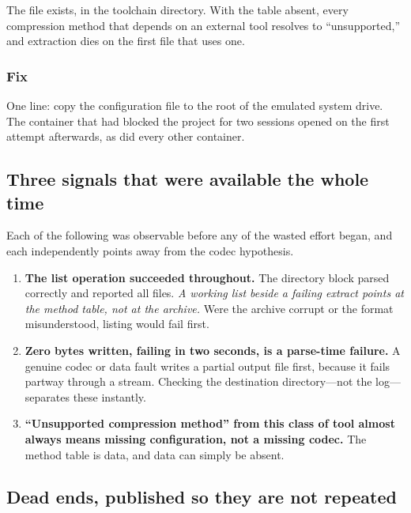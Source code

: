 The file exists, in the toolchain directory. With the table absent, every
compression method that depends on an external tool resolves to ``unsupported,''
and extraction dies on the first file that uses one.

\subsubsection{Fix}

One line: copy the configuration file to the root of the emulated system drive.
The container that had blocked the project for two sessions opened on the first
attempt afterwards, as did every other container.

\subsection{Three signals that were available the whole time}

Each of the following was observable before any of the wasted effort began, and
each independently points away from the codec hypothesis.

\begin{enumerate}
\item \textbf{The list operation succeeded throughout.} The directory block
      parsed correctly and reported all files. \emph{A working list beside a
      failing extract points at the method table, not at the archive.} Were the
      archive corrupt or the format misunderstood, listing would fail first.
\item \textbf{Zero bytes written, failing in two seconds, is a parse-time
      failure.} A genuine codec or data fault writes a partial output file
      first, because it fails partway through a stream. Checking the destination
      directory---not the log---separates these instantly.
\item \textbf{``Unsupported compression method'' from this class of tool almost
      always means missing configuration, not a missing codec.} The method table
      is data, and data can simply be absent.
\end{enumerate}

\subsection{Dead ends, published so they are not repeated}

